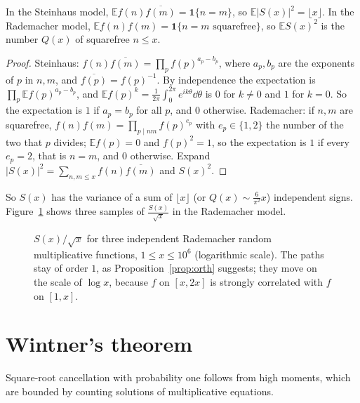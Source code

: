\begin{proposition}\label{prop:orth}
In the Steinhaus model, $\mathbb E f(n)\overline{f(m)}=\mathbf 1\{n=m\}$, so $\mathbb E|S(x)|^2=\lfloor x\rfloor$. In the Rademacher model, $\mathbb Ef(n)f(m)=\mathbf 1\{n=m\text{ squarefree}\}$, so $\mathbb ES(x)^2$ is the number $Q(x)$ of squarefree $n\le x$.
\end{proposition}
\begin{proof}
Steinhaus: $f(n)\overline{f(m)}=\prod_pf(p)^{a_p-b_p}$, where $a_p,b_p$ are the exponents of $p$ in $n,m$, and $\overline{f(p)}=f(p)^{-1}$. By independence the expectation is $\prod_p\mathbb Ef(p)^{a_p-b_p}$, and $\mathbb Ef(p)^k=\frac1{2\pi}\int_0^{2\pi}e^{ik\theta}\dd\theta$ is $0$ for $k\ne0$ and $1$ for $k=0$. So the expectation is $1$ if $a_p=b_p$ for all $p$, and $0$ otherwise. Rademacher: if $n,m$ are squarefree, $f(n)f(m)=\prod_{p\mid nm}f(p)^{e_p}$ with $e_p\in\{1,2\}$ the number of the two that $p$ divides; $\mathbb Ef(p)=0$ and $f(p)^2=1$, so the expectation is $1$ if every $e_p=2$, that is $n=m$, and $0$ otherwise. Expand $|S(x)|^2=\sum_{n,m\le x}f(n)\overline{f(m)}$ and $S(x)^2$.
\end{proof}

So $S(x)$ has the variance of a sum of $\lfloor x\rfloor$ (or $Q(x)\sim\frac6{\pi^2}x$) independent signs. Figure~\ref{fig:rmfpaths} shows three samples of $\frac{S(x)}{\sqrt x}$ in the Rademacher model.

\begin{figure}[ht]
\centering{}
\caption{$S(x)/\sqrt x$ for three independent Rademacher random multiplicative functions, $1\le x\le10^6$ (logarithmic scale). The paths stay of order $1$, as Proposition~\ref{prop:orth} suggests; they move on the scale of $\log x$, because $f$ on $[x,2x]$ is strongly correlated with $f$ on $[1,x]$.}
\label{fig:rmfpaths}
\end{figure}

\section{Wintner's theorem}

Square-root cancellation with probability one follows from high moments, which are bounded by counting solutions of multiplicative equations.


